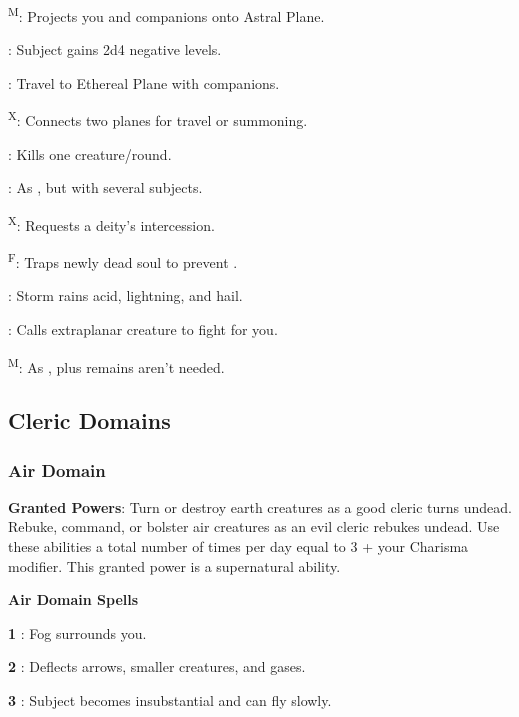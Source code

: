 \textsuperscript{M}: Projects you and companions onto Astral Plane.

: Subject gains 2d4 negative levels.

: Travel to Ethereal Plane with companions.

\textsuperscript{X}: Connects two planes for travel or summoning.

: Kills one creature/round.

: As , but with several subjects.

\textsuperscript{X}: Requests a deity's intercession.

\textsuperscript{F}: Traps newly dead soul to prevent .

: Storm rains acid, lightning, and hail.

: Calls extraplanar creature to fight for you.

\textsuperscript{M}: As , plus remains aren't needed.

\subsection{Cleric Domains}

\subsubsection{Air Domain}

\textbf{Granted Powers}: Turn or destroy earth creatures as a good cleric turns undead. Rebuke, command, or bolster air creatures as an evil cleric rebukes undead. Use these abilities a total number of times per day equal to 3 + your Charisma modifier. This granted power is a supernatural ability.

\textbf{Air Domain Spells}

\textbf{1} : Fog surrounds you.

\textbf{2} : Deflects arrows, smaller creatures, and gases.

\textbf{3} : Subject becomes insubstantial and can fly slowly.

